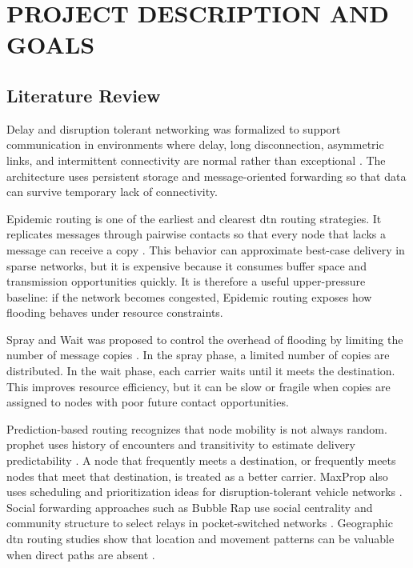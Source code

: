 \chapter{\MakeUppercase{Project Description and Goals}}
\section{Literature Review}
Delay and disruption tolerant networking was formalized to support communication in environments where delay, long disconnection, asymmetric links, and intermittent connectivity are normal rather than exceptional \citep{cerf2007dtn}. The architecture uses persistent storage and message-oriented forwarding so that data can survive temporary lack of connectivity.

Epidemic routing is one of the earliest and clearest \ac{dtn} routing strategies. It replicates messages through pairwise contacts so that every node that lacks a message can receive a copy \citep{vahdat2000epidemic}. This behavior can approximate best-case delivery in sparse networks, but it is expensive because it consumes buffer space and transmission opportunities quickly. It is therefore a useful upper-pressure baseline: if the network becomes congested, Epidemic routing exposes how flooding behaves under resource constraints.

Spray and Wait was proposed to control the overhead of flooding by limiting the number of message copies \citep{spyropoulos2005spray}. In the spray phase, a limited number of copies are distributed. In the wait phase, each carrier waits until it meets the destination. This improves resource efficiency, but it can be slow or fragile when copies are assigned to nodes with poor future contact opportunities.

Prediction-based routing recognizes that node mobility is not always random. \ac{prophet} uses history of encounters and transitivity to estimate delivery predictability \citep{lindgren2012prophet}. A node that frequently meets a destination, or frequently meets nodes that meet that destination, is treated as a better carrier. MaxProp also uses scheduling and prioritization ideas for disruption-tolerant vehicle networks \citep{burgess2006maxprop}. Social forwarding approaches such as Bubble Rap use social centrality and community structure to select relays in pocket-switched networks \citep{hui2008bubble}. Geographic \ac{dtn} routing studies show that location and movement patterns can be valuable when direct paths are absent \citep{wang2016geographic}.


